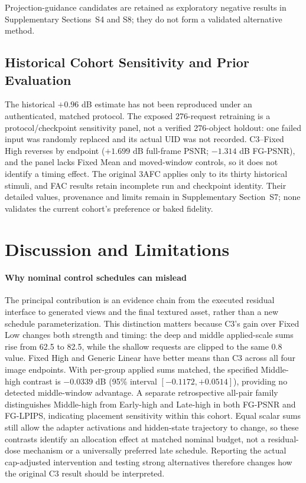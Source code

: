 \documentclass[times,twocolumn,final]{elsarticle}
\begin{document}
Projection-guidance candidates are retained as exploratory negative results in Supplementary Sections~S4 and S8; they do not form a validated alternative method.

\subsection{Historical Cohort Sensitivity and Prior Evaluation}
\label{subsec:original276}

The historical $+0.96$ dB estimate has not been reproduced under an authenticated, matched protocol. The exposed 276-request retraining is a protocol/checkpoint sensitivity panel, not a verified 276-object holdout: one failed input was randomly replaced and its actual UID was not recorded. C3--Fixed High reverses by endpoint ($+1.699$ dB full-frame PSNR; $-1.314$ dB FG-PSNR), and the panel lacks Fixed Mean and moved-window controls, so it does not identify a timing effect. The original 3AFC applies only to its thirty historical stimuli, and FAC results retain incomplete run and checkpoint identity. Their detailed values, provenance and limits remain in Supplementary Section~S7; none validates the current cohort's preference or baked fidelity.


\FloatBarrier
\section{Discussion and Limitations}
\label{sec:limitations}

\paragraph{Why nominal control schedules can mislead}
The principal contribution is an evidence chain from the executed residual interface to generated views and the final textured asset, rather than a new schedule parameterization. This distinction matters because C3's gain over Fixed Low changes both strength and timing: the deep and middle applied-scale sums rise from 62.5 to 82.5, while the shallow requests are clipped to the same 0.8 value. Fixed High and Generic Linear have better means than C3 across all four image endpoints. With per-group applied sums matched, the specified Middle-high contrast is $-0.0339$ dB (95\% interval $[-0.1172,+0.0514]$), providing no detected middle-window advantage. A separate retrospective all-pair family distinguishes Middle-high from Early-high and Late-high in both FG-PSNR and FG-LPIPS, indicating placement sensitivity within this cohort. Equal scalar sums still allow the adapter activations and hidden-state trajectory to change, so these contrasts identify an allocation effect at matched nominal budget, not a residual-dose mechanism or a universally preferred late schedule. Reporting the actual cap-adjusted intervention and testing strong alternatives therefore changes how the original C3 result should be interpreted.
\end{document}
